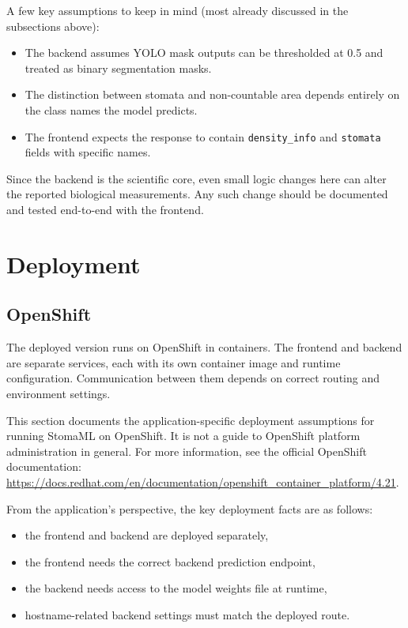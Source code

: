 \documentclass{article}
\begin{document}
A few key assumptions to keep in mind (most already discussed in the subsections above):

\begin{itemize}
    \item The backend assumes YOLO mask outputs can be thresholded at 0.5 and treated as binary segmentation masks.
    \item The distinction between stomata and non-countable area depends entirely on the class names the model predicts.
    \item The frontend expects the response to contain \texttt{density\_info} and \texttt{stomata} fields with specific names.
\end{itemize}

Since the backend is the scientific core, even small logic changes here can alter the reported biological measurements. Any such change should be documented and tested end-to-end with the frontend.


\section{Deployment}

\subsection{OpenShift}

The deployed version runs on OpenShift in containers. The frontend and backend are separate services, each with its own container image and runtime configuration. Communication between them depends on correct routing and environment settings.

This section documents the application-specific deployment assumptions for running StomaML on OpenShift. It is not a guide to OpenShift platform administration in general. For more information, see the official OpenShift documentation: \href{https://docs.redhat.com/en/documentation/openshift_container_platform/4.21}{https://docs.redhat.com/en/documentation/openshift\_container\_platform/4.21}.

From the application's perspective, the key deployment facts are as follows:
\begin{itemize}
    \item the frontend and backend are deployed separately,
    \item the frontend needs the correct backend prediction endpoint,
    \item the backend needs access to the model weights file at runtime,
    \item hostname-related backend settings must match the deployed route.
\end{itemize}
\end{document}

